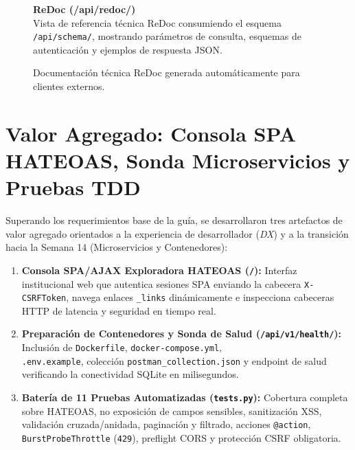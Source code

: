 \documentclass[10pt,a4paper]{article}
\begin{document}
\begin{figure}[H]
\centering
\begin{minipage}[c]{0.73\textwidth}
    \centering
\end{minipage}\hfill
\begin{minipage}[c]{0.24\textwidth}
    \raggedright
    \textbf{\color{uncpnavy}\small ReDoc (/api/redoc/)}\\[4pt]
    \footnotesize
    \color{uncpdark}
    Vista de referencia técnica ReDoc consumiendo el esquema \texttt{/api/schema/}, mostrando parámetros de consulta, esquemas de autenticación y ejemplos de respuesta JSON.
\end{minipage}
\vspace{-0.2cm}
\caption{Documentación técnica ReDoc generada automáticamente para clientes externos.}
\label{fig:interfaz_redoc}
\end{figure}

\newpage

\section{Valor Agregado: Consola SPA HATEOAS, Sonda Microservicios y Pruebas TDD}
Superando los requerimientos base de la guía, se desarrollaron tres artefactos de valor agregado orientados a la experiencia de desarrollador (\textit{DX}) y a la transición hacia la Semana 14 (Microservicios y Contenedores):
\begin{enumerate}
    \item \textbf{Consola SPA/AJAX Exploradora HATEOAS (\texttt{/}):} Interfaz institucional web que autentica sesiones SPA enviando la cabecera \texttt{X-CSRFToken}, navega enlaces \texttt{\_links} dinámicamente e inspecciona cabeceras HTTP de latencia y seguridad en tiempo real.
    \item \textbf{Preparación de Contenedores y Sonda de Salud (\texttt{/api/v1/health/}):} Inclusión de \texttt{Dockerfile}, \texttt{docker-compose.yml},\\ \texttt{.env.example}, colección \texttt{postman\_collection.json} y endpoint de salud verificando la conectividad SQLite en milisegundos.
    \item \textbf{Batería de 11 Pruebas Automatizadas (\texttt{tests.py}):} Cobertura completa sobre HATEOAS, no exposición de campos sensibles, sanitización XSS, validación cruzada/anidada, paginación y filtrado, acciones \texttt{@action}, \texttt{BurstProbeThrottle} (\texttt{429}), preflight CORS y protección CSRF obligatoria.
\end{enumerate}
\end{document}
